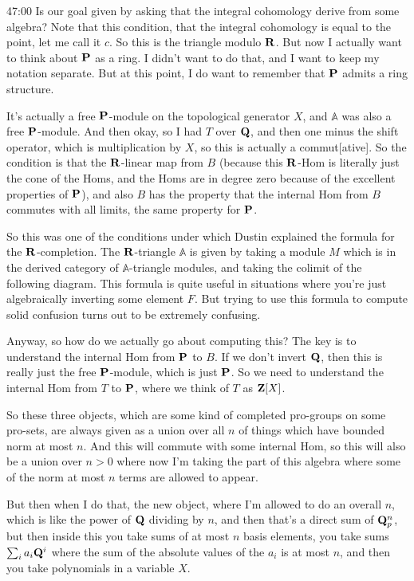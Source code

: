 \begin{unfinished}{47:00}
Is our goal given by asking that the integral cohomology derive from some algebra? Note that this condition, that the integral cohomology is equal to the point, let me call it $c$. So this is the triangle modulo $\R$. But now I actually want to think about $\P$ as a ring. I didn't want to do that, and I want to keep my notation separate. But at this point, I do want to remember that $\P$ admits a ring structure.

It's actually a free $\P$-module on the topological generator $X$, and $\mathbb{A}$ was also a free $\P$-module. And then okay, so I had $T$ over $\Q$, and then one minus the shift operator, which is multiplication by $X$, so this is actually a commut[ative]. So the condition is that the $\R$-linear map from $B$ (because this $\R$-Hom is literally just the cone of the Homs, and the Homs are in degree zero because of the excellent properties of $\P$), and also $B$ has the property that the internal Hom from $B$ commutes with all limits, the same property for $\P$.

So this was one of the conditions under which Dustin explained the formula for the $\R$-completion. The $\R$-triangle $\mathbb{A}$ is given by taking a module $M$ which is in the derived category of $\mathbb{A}$-triangle modules, and taking the colimit of the following diagram. This formula is quite useful in situations where you're just algebraically inverting some element $F$. But trying to use this formula to compute solid confusion turns out to be extremely confusing.

Anyway, so how do we actually go about computing this? The key is to understand the internal Hom from $\P$ to $B$. If we don't invert $\Q$, then this is really just the free $\P$-module, which is just $\P$. So we need to understand the internal Hom from $T$ to $\P$, where we think of $T$ as $\Z[X]$.

So these three objects, which are some kind of completed pro-groups on some pro-sets, are always given as a union over all $n$ of things which have bounded norm at most $n$. And this will commute with some internal Hom, so this will also be a union over $n > 0$ where now I'm taking the part of this algebra where some of the norm at most $n$ terms are allowed to appear. 

But then when I do that, the new object, where I'm allowed to do an overall $n$, which is like the power of $\Q$ dividing by $n$, and then that's a direct sum of $\Q_p^n$, but then inside this you take sums of at most $n$ basis elements, you take sums $\sum_{i} a_i \Q^i$ where the sum of the absolute values of the $a_i$ is at most $n$, and then you take polynomials in a variable $X$.


\end{unfinished}
